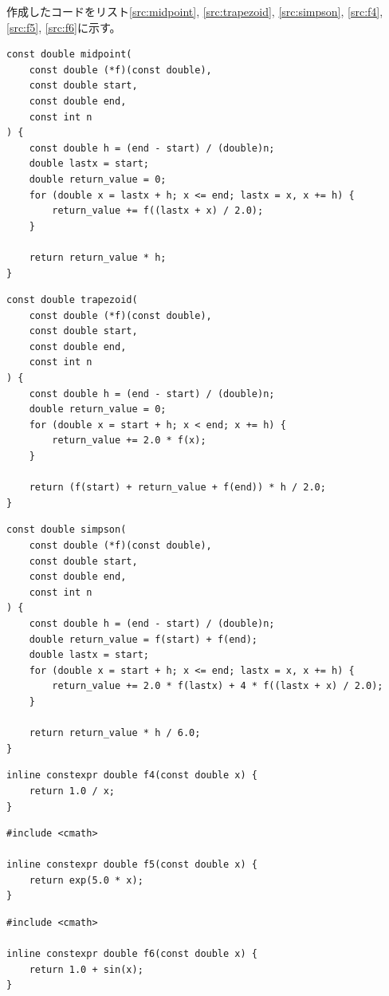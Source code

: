 \documentclass[a4j, titlepage]{jsarticle}
\numberwithin{equation}{section}
\begin{document}
            作成したコードをリスト\ref{src:midpoint}, \ref{src:trapezoid}, \ref{src:simpson}, \ref{src:f4}, \ref{src:f5}, \ref{src:f6}に示す。
            \begin{lstlisting}[caption=式(\ref{equ:midpoint})の実装, label=src:midpoint]
const double midpoint(
    const double (*f)(const double),
    const double start,
    const double end,
    const int n
) {
    const double h = (end - start) / (double)n;
    double lastx = start;
    double return_value = 0;
    for (double x = lastx + h; x <= end; lastx = x, x += h) {
        return_value += f((lastx + x) / 2.0);
    }

    return return_value * h;
}
            \end{lstlisting}
            \begin{lstlisting}[caption=式(\ref{equ:trapezoid})の実装, label=src:trapezoid]
const double trapezoid(
    const double (*f)(const double),
    const double start,
    const double end,
    const int n
) {
    const double h = (end - start) / (double)n;
    double return_value = 0;
    for (double x = start + h; x < end; x += h) {
        return_value += 2.0 * f(x);
    }

    return (f(start) + return_value + f(end)) * h / 2.0;
}
            \end{lstlisting}
            \begin{lstlisting}[caption=式(\ref{equ:simpson})の実装, label=src:simpson]
const double simpson(
    const double (*f)(const double),
    const double start,
    const double end,
    const int n
) {
    const double h = (end - start) / (double)n;
    double return_value = f(start) + f(end);
    double lastx = start;
    for (double x = start + h; x <= end; lastx = x, x += h) {
        return_value += 2.0 * f(lastx) + 4 * f((lastx + x) / 2.0);
    }

    return return_value * h / 6.0;
}
            \end{lstlisting}
            \begin{lstlisting}[caption=$f_4(x)$の実装, label=src:f4]
inline constexpr double f4(const double x) {
    return 1.0 / x;
}
            \end{lstlisting}
            \begin{lstlisting}[caption=$f_5(x)$の実装, label=src:f5]
#include <cmath>

inline constexpr double f5(const double x) {
    return exp(5.0 * x);
}
            \end{lstlisting}
            \begin{lstlisting}[caption=$f_{6,7}(x)$の実装, label=src:f6]
#include <cmath>

inline constexpr double f6(const double x) {
    return 1.0 + sin(x);
}
            \end{lstlisting}
\end{document}
